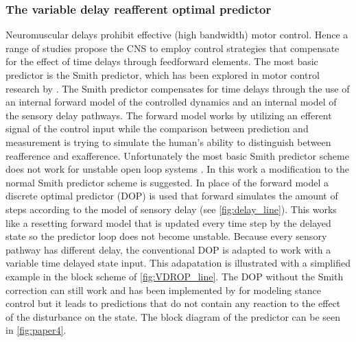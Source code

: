 \subsubsection{The variable delay reafferent optimal predictor}
Neuromuscular delays prohibit effective (high bandwidth) motor control. Hence a range of studies propose the CNS to employ control strategies
that compensate for the effect of time delays through feedforward elements. The most basic predictor is the Smith predictor, which has been explored in motor control research by \citet{miall1993cerebellum}. The Smith predictor compensates for time delays through the use of an internal forward model of the controlled dynamics and an internal model of the sensory delay pathways. The forward model works by utilizing an efferent signal of the control input while the comparison between prediction and measurement is trying to simulate the human's ability to distinguish between reafference and exafference.  Unfortunately the  most basic Smith predictor scheme does not work for unstable open loop systems \cite{smith1957closed}. In this work a modification to the normal Smith predictor scheme is suggested. In place of the forward model a discrete optimal predictor  (DOP) is used that forward simulates the amount of steps according to the model of sensory delay (see \cref{fig:delay_line}). This works like a resetting forward model that is updated every time step by the delayed state so the predictor loop does not become unstable. Because every sensory pathway has different delay, the conventional DOP is adapted to work with a variable time delayed state input. This adapatation is illustrated with a simplified example in the block scheme of \cref{fig:VDROP_line}.  The DOP   without the Smith  correction can still work and has been implemented by \citet{van2001adaptive} for modeling stance control but it leads to predictions that do not contain any reaction to the effect of the disturbance on the state. The block diagram of the predictor can be seen in \cref{fig:paper4}.

